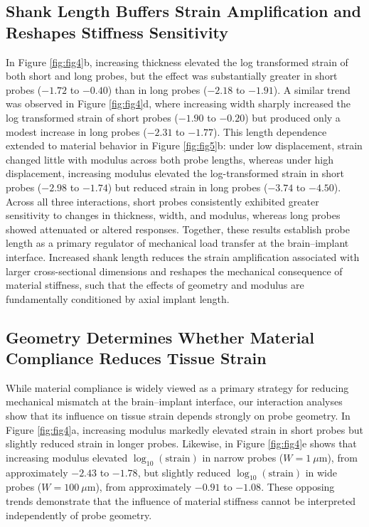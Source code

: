 \documentclass[fleqn,10pt]{wlscirep}
\begin{document}
\subsection{Shank Length Buffers Strain Amplification and Reshapes Stiffness Sensitivity}
In Figure \ref{fig:fig4}b, increasing thickness elevated the log transformed strain of both short and long probes, but the effect was substantially greater in short probes ($-1.72$ to $-0.40$) than in long probes ($-2.18$ to $-1.91$). A similar trend was observed in Figure \ref{fig:fig4}d, where increasing width sharply increased the log transformed strain of short probes ($-1.90$ to $-0.20$) but produced only a modest increase in long probes ($-2.31$ to $-1.77$). 
This length dependence extended to material behavior in Figure \ref{fig:fig5}b: under low displacement, strain changed little with modulus across both probe lengths, whereas under high displacement, increasing modulus elevated the log-transformed strain in short probes ($-2.98$ to $-1.74$) but reduced strain in long probes ($-3.74$ to $-4.50$). 
Across all three interactions, short probes consistently exhibited greater sensitivity to changes in thickness, width, and modulus, whereas long probes showed attenuated or altered responses. Together, these results establish probe length as a primary regulator of mechanical load transfer at the brain–implant interface. Increased shank length reduces the strain amplification associated with larger cross-sectional dimensions and reshapes the mechanical consequence of material stiffness, such that the effects of geometry and modulus are fundamentally conditioned by axial implant length.

\subsection{Geometry Determines Whether Material Compliance Reduces Tissue Strain}
While material compliance is widely viewed as a primary strategy for reducing mechanical mismatch at the brain–implant interface, our interaction analyses show that its influence on tissue strain depends strongly on probe geometry. In Figure \ref{fig:fig4}a, increasing modulus markedly elevated strain in short probes but slightly reduced strain in longer probes. Likewise, in Figure \ref{fig:fig4}e shows that increasing modulus elevated $\log_{10}(\mathrm{strain})$ in narrow probes ($W=1~\mu\mathrm{m}$), from approximately $-2.43$ to $-1.78$, but slightly reduced $\log_{10}(\mathrm{strain})$ in wide probes ($W=100~\mu\mathrm{m}$), from approximately $-0.91$ to $-1.08$. These opposing trends demonstrate that the influence of material stiffness cannot be interpreted independently of probe geometry.
\end{document}
